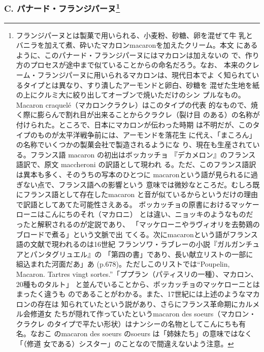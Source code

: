 \begin{recette}
{\subsubsection[C. パナード・フランジパーヌ]{\texorpdfstring{C.
パナード・フランジパーヌ\footnote{フランジパーヌとは製菓で用いられる、小麦粉、砂糖、卵を混ぜて牛
  乳とバニラを加えて煮、砕いたマカロンmacaronを加えたクリーム。本文
  にあるように、このパナード・フランジパーヌにはマカロンは加えないの
  で、作り方のプロセスが途中まで似ていることからの命名だろう。なお、
  本来のクレーム・フランジパーヌに用いられるマカロンは、現代日本でよ
  く知られているタイプとは異なり、すり潰したアーモンドと卵白、砂糖を
  混ぜた生地を紙の上にクルミ大に絞り出してオーブンで焼いただけのシン
  プルなもの。Macaron craquelé（マカロンクラクレ）はこのタイプの代表
  的なもので、焼く際に膨らんで割れ目が出来ることからクラクレ（裂け目
  のある）の名称が付けられた。ところで、日本にマカロンが伝わった時期
  は不明だが、このタイプのものが太平洋戦争前には、アーモンドを落花生
  に代え、「まころん」の名称でいくつかの製菓会社で製造されるようにな
  り、現在も生産されている。フランス語 macaron の初出はボッカッチョ
  『デカメロン』のフランス語訳で、原文 maccheroni の訳語として現われ
  る。ただ、このフランス語訳は異本も多く、そのうちの写本のひとつに
  macaronという語が見られるに過ぎない点で、フランス語への影響という
  意味では微妙なところだ。むしろ既にフランス語として存在したmacaron
  と音が似ているからというだけの理由で訳語としてあてた可能性さえある。
  ボッカッチョの原書におけるマッケーローニはこんにちのそれ（マカロニ）
  とは違い、ニョッキのようなものだったと解釈されるのが定説であり、
  「マッケローニやラヴィオリを去勢鶏のブロードで煮る」という文脈で出
  てくる。次にmacaronという語がフランス語の文献で現われるのは16世紀
  フランソワ・ラブレーの小説『ガルガンチュアとパンタグリュエル』の
  「第四の書」であり、長い献立リストの一部に組込まれた河面だあ」あ
  (p.678)。ただしこのリストでは``Poupelin, Macaron. Tartres vingt
  sortes.''「ププラン（パティスリの一種）、マカロン、20種ものタルト」
  と並んでいることから、ボッカッチョのマッケローニとはまったく違うも
  のであることがわかる。また、17世紀には上述のようなマカロンの存在は
  知られていたという説があり、さらにフランス革命期にカルメル会修道女
  たちが隠れて作っていたというmacaron des soeurs（マカロン・クラクレ
  のタイプで平たい形状）はナンシーの名物としてこんにちも有名。なおこ
  のmacaron des soeurs のsoeurs は「姉妹たち」の意味ではなく「（修道
  女である）シスター」のことなので間違えないよう注意。}}{C. パナード・フランジパーヌ}}\label{panade-c}}



\end{recette}
